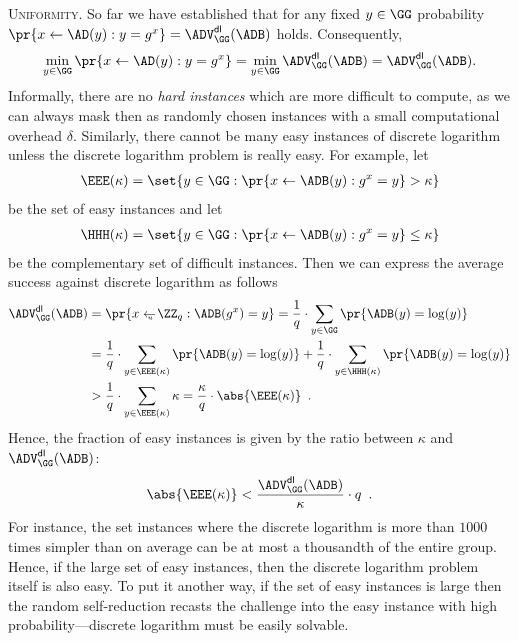 \documentclass{crypto-exercise}
\begin{document}
\begin{solution}
\vspace*{2ex}
\noindent\textsc{Uniformity.}
So far we have established that for any fixed $y \in \GG$ probability $\pr{x \gets \AD(y): y = g^{x}} = \ADVDL{\GG}{\ADB}$ holds. Consequently,
\begin{align*}
 \min_{y \in \GG} \pr{x \gets \AD(y): y = g^{x}} = \min_{y \in \GG} \ADVDL{\GG}{\ADB} = \ADVDL{\GG}{\ADB}.
\end{align*}
Informally, there are no \emph{hard instances} which are more difficult to compute, as we can always mask then as randomly chosen instances with a small computational overhead $\delta$. Similarly, there cannot be many easy instances of discrete logarithm unless the discrete logarithm problem is really easy. For example, let 
\begin{align*}
\EEE(\kappa)=\set{ y \in \GG: \pr{x \gets \ADB(y): g^{x} = y}>\kappa}
\end{align*}
be the set of easy instances and  let
\begin{align*}
\HHH(\kappa)=\set{ y \in \GG: \pr{x \gets \ADB(y): g^{x} = y}\leq\kappa}
\end{align*}
be the complementary set of difficult instances. Then we can express the average success against discrete logarithm as follows
\begin{align*}
\ADVDL{\GG}{\ADB} & = \pr{x \getsu \ZZ_q: \ADB(g^x)= y} = \frac{1}{q}\cdot \sum\limits_{y \in \GG} \pr{\ADB(y)= \log(y)} \\
& = \frac{1}{q}\cdot \sum\limits_{y \in \EEE(\kappa)} \pr{\ADB(y)= \log(y)} + \frac{1}{q}\cdot\sum\limits_{y \in \HHH(\kappa)} \pr{\ADB(y)= \log(y)}\\
&> \frac{1}{q}\cdot \sum\limits_{y \in \EEE(\kappa)}\kappa =\frac{\kappa}{q}\cdot \abs{\EEE(\kappa)}\enspace.
\end{align*}
Hence, the fraction of easy instances is given by the ratio between $\kappa$ and $\ADVDL{\GG}{\ADB}$: 
\begin{align*}
\abs{\EEE(\kappa)} < \frac{\ADVDL{\GG}{\ADB}}{\kappa}\cdot q \enspace.
\end{align*}
For instance, the set instances where the discrete logarithm is more than $1000$ times simpler than on average can be at most a thousandth of the entire group. Hence, if the large set of easy instances, then the discrete logarithm problem itself is also easy. To put it another way, if the set of easy instances is large then the random self-reduction recasts the challenge into the easy instance with high probability---discrete logarithm must be easily solvable.    


\end{solution}
\end{document}
